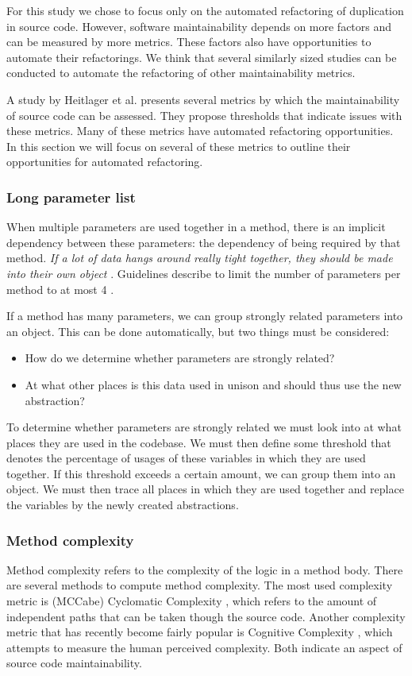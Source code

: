 For this study we chose to focus only on the automated refactoring of duplication in source code. However, software maintainability depends on more factors and can be measured by more metrics. These factors also have opportunities to automate their refactorings. We think that several similarly sized studies can be conducted to automate the refactoring of other maintainability metrics.

A study by Heitlager et al. \cite{heitlager2007practical} presents several metrics by which the maintainability of source code can be assessed. They propose thresholds that indicate issues with these metrics. Many of these metrics have automated refactoring opportunities. In this section we will focus on several of these metrics to outline their opportunities for automated refactoring.

\subsubsection{Long parameter list}
When multiple parameters are used together in a method, there is an implicit dependency between these parameters: the dependency of being required by that method. \textit{If a lot of data hangs around really tight together, they should be made into their own object} \cite{fowler1999refactoring, visser2016building}. Guidelines describe to limit the number of parameters per method to at most 4 \cite{visser2016building}.

If a method has many parameters, we can group strongly related parameters into an object. This can be done automatically, but two things must be considered:
\begin{itemize}
  \item How do we determine whether parameters are strongly related?
  \item At what other places is this data used in unison and should thus use the new abstraction?
\end{itemize}
To determine whether parameters are strongly related we must look into at what places they are used in the codebase. We must then define some threshold that denotes the percentage of usages of these variables in which they are used together. If this threshold exceeds a certain amount, we can group them into an object. We must then trace all places in which they are used together and replace the variables by the newly created abstractions.

\subsubsection{Method complexity}
Method complexity refers to the complexity of the logic in a method body. There are several methods to compute method complexity. The most used complexity metric is (MCCabe) Cyclomatic Complexity \cite{visser2016building}, which refers to the amount of independent paths that can be taken though the source code. Another complexity metric that has recently become fairly popular is Cognitive Complexity \cite{campbell2017cognitive}, which attempts to measure the human perceived complexity. Both indicate an aspect of source code maintainability.

